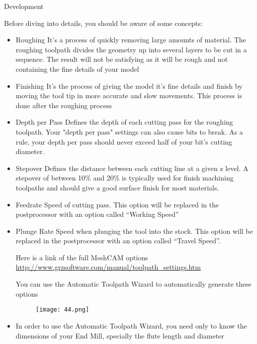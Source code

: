 \documentclass[a4paper]{book}
\begin{document}
\begin{chapter}{Development}
\begin{itemize}
\end{itemize}
Before diving into details, you should be aware of some concepts:
\begin{itemize}
	\item Roughing
	\newline
	It’s a process of quickly removing large amounts of material.  The roughing toolpath divides the geometry up into several layers to be cut in a sequence.  The result will not be satisfying as it will be rough and not containing the fine details of your model
	\item Finishing
	\newline
	It’s the process of giving the model it’s fine details and finish by moving the tool tip in more accurate and slow movements. This process is done after the roughing process
	\item Depth per Pass
	\newline
	Defines the depth of each cutting pass for the roughing toolpath. Your "depth per pass" settings can also cause bits to break. As a rule, your depth per pass should never exceed half of your bit's cutting diameter. 
	\item Stepover
	\newline
	Defines the distance between each cutting line at a given z level. A stepover of between 10\% and 20\% is typically used for finish machining toolpaths and should give a good surface finish for most materials. 
	\item Feedrate
	\newline
	Speed of cutting pass. This option will be replaced in the postprocessor with an option called “Working Speed”
	\item Plunge Rate
	Speed when plunging the tool into the stock. This option will be replaced in the postprocessor with an option called “Travel Speed”.
	
	Here is a link of the full MeshCAM options 
	\newline
	\url{http://www.grzsoftware.com/manual/toolpath_settings.htm}
	\newline
	
	You can use the Automatic Toolpath Wizard to automatically generate these options
	\begin{figure}[H]
		\centering
		\texttt{[image: 44.png]}
	\end{figure}


\item In order to use the Automatic Toolpath Wizard, you need only to know the dimensions of your End Mill, specially the flute length and diameter


\end{itemize}
\end{chapter}
\end{document}
